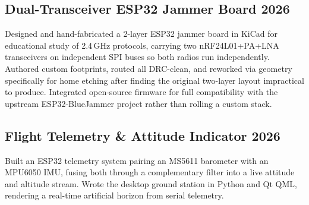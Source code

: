 \documentclass[10pt,a4paper]{article}
\begin{document}
\subsection*{Dual-Transceiver ESP32 Jammer Board \hfill 2026}
Designed and hand-fabricated a 2-layer ESP32 jammer board in KiCad for
educational study of 2.4\,GHz protocols, carrying two nRF24L01+PA+LNA
transceivers on independent SPI buses so both radios run independently. Authored
custom footprints, routed all DRC-clean, and reworked via geometry specifically
for home etching after finding the original two-layer layout impractical to
produce.
Integrated open-source firmware for full compatibility with the upstream
ESP32-BlueJammer project rather than rolling a custom stack.

\subsection*{Flight Telemetry \& Attitude Indicator \hfill 2026}
Built an ESP32 telemetry system pairing an MS5611 barometer with an MPU6050 IMU,
fusing both through a complementary filter into a live attitude and altitude
stream. Wrote the desktop ground station in Python and Qt QML, rendering a
real-time artificial horizon from serial telemetry.
\end{document}
